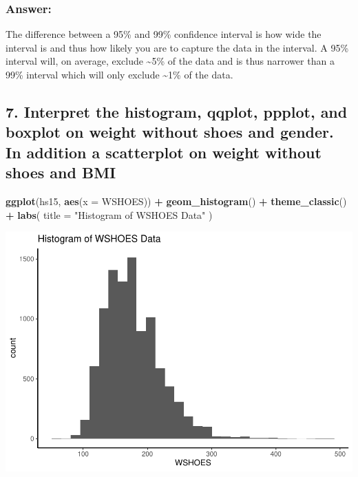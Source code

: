 \documentclass[]{article}
\newenvironment{Shaded}{\begin{snugshade}}{\end{snugshade}}
\newcommand{\DataTypeTok}[1]{\textcolor[rgb]{0.13,0.29,0.53}{#1}}
\newcommand{\KeywordTok}[1]{\textcolor[rgb]{0.13,0.29,0.53}{\textbf{#1}}}
\newcommand{\NormalTok}[1]{#1}
\newcommand{\OperatorTok}[1]{\textcolor[rgb]{0.81,0.36,0.00}{\textbf{#1}}}
\newcommand{\StringTok}[1]{\textcolor[rgb]{0.31,0.60,0.02}{#1}}
\begin{document}
\hypertarget{answer-5}{%
\subsubsection{Answer:}\label{answer-5}}

The difference between a 95\% and 99\% confidence interval is how wide
the interval is and thus how likely you are to capture the data in the
interval. A 95\% interval will, on average, exclude \textasciitilde5\%
of the data and is thus narrower than a 99\% interval which will only
exclude \textasciitilde1\% of the data.

\hypertarget{interpret-the-histogram-qqplot-ppplot-and-boxplot-on-weight-without-shoes-and-gender.-in-addition-a-scatterplot-on-weight-without-shoes-and-bmi}{%
\subsection{7. Interpret the histogram, qqplot, ppplot, and boxplot on
weight without shoes and gender. In addition a scatterplot on weight
without shoes and
BMI}\label{interpret-the-histogram-qqplot-ppplot-and-boxplot-on-weight-without-shoes-and-gender.-in-addition-a-scatterplot-on-weight-without-shoes-and-bmi}}

\begin{Shaded}
\begin{Highlighting}[]
\KeywordTok{ggplot}\NormalTok{(hs15, }\KeywordTok{aes}\NormalTok{(}\DataTypeTok{x =}\NormalTok{ WSHOES)) }\OperatorTok{+}
\StringTok{  }\KeywordTok{geom_histogram}\NormalTok{() }\OperatorTok{+}
\StringTok{  }\KeywordTok{theme_classic}\NormalTok{() }\OperatorTok{+}
\StringTok{  }\KeywordTok{labs}\NormalTok{(}
    \DataTypeTok{title =} \StringTok{"Histogram of WSHOES Data"}
\NormalTok{  )}
\end{Highlighting}
\end{Shaded}

\includegraphics{assignment2_files/figure-latex/q7-1.pdf}
\end{document}
